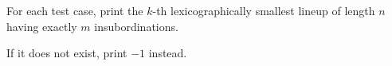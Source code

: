 For each test case, print the $k$-th lexicographically smallest lineup of length $n$ having exactly $m$ insubordinations.

If it does not exist, print $-1$ instead.
